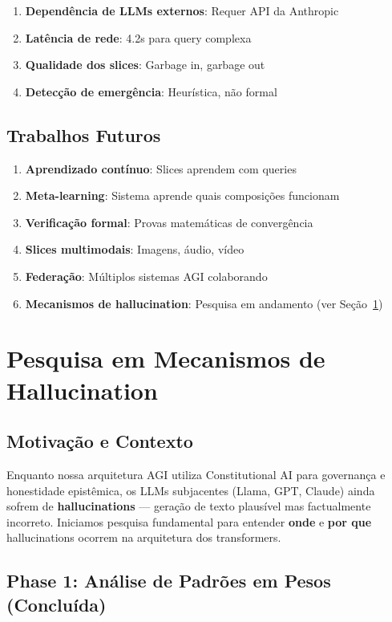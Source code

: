 \documentclass[11pt]{article}
\begin{document}
\begin{enumerate}
    \item \textbf{Dependência de LLMs externos}: Requer API da Anthropic
    \item \textbf{Latência de rede}: 4.2s para query complexa
    \item \textbf{Qualidade dos slices}: Garbage in, garbage out
    \item \textbf{Detecção de emergência}: Heurística, não formal
\end{enumerate}

\subsection{Trabalhos Futuros}

\begin{enumerate}
    \item \textbf{Aprendizado contínuo}: Slices aprendem com queries
    \item \textbf{Meta-learning}: Sistema aprende quais composições funcionam
    \item \textbf{Verificação formal}: Provas matemáticas de convergência
    \item \textbf{Slices multimodais}: Imagens, áudio, vídeo
    \item \textbf{Federação}: Múltiplos sistemas AGI colaborando
    \item \textbf{Mecanismos de hallucination}: Pesquisa em andamento (ver Seção~\ref{sec:hallucination})
\end{enumerate}

\section{Pesquisa em Mecanismos de Hallucination}\label{sec:hallucination}

\subsection{Motivação e Contexto}

Enquanto nossa arquitetura AGI utiliza Constitutional AI para governança e honestidade epistêmica, os LLMs subjacentes (Llama, GPT, Claude) ainda sofrem de \textbf{hallucinations} --- geração de texto plausível mas factualmente incorreto. Iniciamos pesquisa fundamental para entender \textbf{onde} e \textbf{por que} hallucinations ocorrem na arquitetura dos transformers.

\subsection{Phase 1: Análise de Padrões em Pesos (Concluída)}
\end{document}
